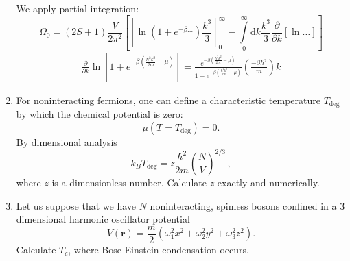 \documentclass[11pt, a4paper]{article}
\newcommand{\dd}{\mathrm{d}}
\begin{document}
\begin{enumerate}
\begin{align*}
    \end{align*}
    We apply partial integration:
    \begin{equation*}
        \Omega_0 = (2S+1)\frac{V}{2\pi^2}
        \left[
            \left[\ln\left(1+e^{-\beta\dots}\right)\frac{k^3}{3}\right]_{0}^{\infty}
            - \int\limits_{0}^{\infty}\dd k \frac{k^3}{3} \frac{\partial}{\partial k}\left[\ln \dots\right]
        \right]
    \end{equation*}
    \begin{align*}
        \frac{\partial}{\partial k}\ln\left[1+e^{-\beta\left(\frac{\hbar^2k^2}{2m} - \mu\right)}\right]
        = \frac{e^{-\beta\left(\frac{\hbar^2k^2}{2m} - \mu\right)}}{1+e^{-\beta\left(\frac{\hbar^2k^2}{2m} - \mu\right)}}
        \left(\frac{-\beta\hbar^2}{m}\right)k
    \end{align*}
    \item For noninteracting fermions, one can define a characteristic temperature $T_{\textrm{deg}}$
    by which the chemical potential is zero:
    \begin{equation*}
        \mu(T=T_{\textrm{deg}}) = 0.
    \end{equation*}
    By dimensional analysis
    \begin{equation*}
        k_BT_{\textrm{deg}} = z \frac{\hbar^2}{2m}\left(\frac{N}{V}\right)^{2/3}\,,
    \end{equation*}
    where $z$ is a dimensionless number. Calculate $z$ exactly and numerically.

    \item Let us suppose that we have $N$ noninteracting, spinless bosons confined in a
    3 dimensional harmonic oscillator potential
    \begin{equation*}
        V(\mathbf{r}) = \frac{m}{2}(\omega_1^2x^2 + \omega_2^2y^2 + \omega_3^2z^2).
    \end{equation*}
    Calculate $T_c$, where Bose-Einstein condensation occurs.
\end{enumerate}
\end{document}
